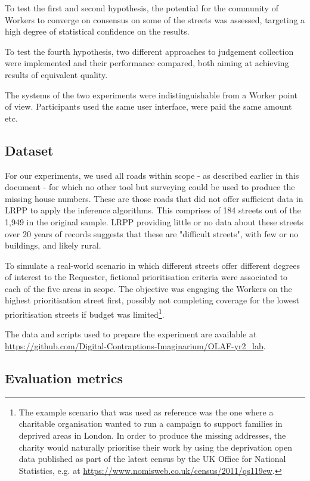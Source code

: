 To test the first and second hypothesis, the potential for the community of Workers to converge on consensus on some of the streets was assessed, targeting a high degree of statistical confidence on the results.

To test the fourth hypothesis, two different approaches to judgement collection were implemented and their performance compared, both aiming at achieving results of equivalent quality.

The systems of the two experiments were indistinguishable from a Worker point of view. Participants used the same user interface, were paid the same amount etc.

\subsection{Dataset}

For our experiments, we used all roads within scope - as described earlier in this document - for which no other tool but surveying could be used to produce the missing house numbers. These are those roads that did not offer sufficient data in LRPP to apply the inference algorithms. This comprises of 184 streets out of the 1,949 in the original sample. LRPP providing little or no data about these streets over 20 years of records suggests that these are "difficult streets", with few or no buildings, and likely rural.

To simulate a real-world scenario in which different streets offer different degrees of interest to the Requester, fictional prioritisation criteria were associated to each of the five areas in scope. The objective was engaging the Workers on the highest prioritisation street first, possibly not completing coverage for the lowest prioritisation streets if budget was limited\footnote{The example scenario that was used as reference was the one where a charitable organisation wanted to run a campaign to support families in deprived areas in London. In order to produce the missing addresses, the charity would naturally prioritise their work by using the deprivation open data published as part of the latest census by the UK Office for National Statistics, e.g. at \url{https://www.nomisweb.co.uk/census/2011/qs119ew}.}.

The data and scripts used to prepare the experiment are available at \url{https://github.com/Digital-Contraptions-Imaginarium/OLAF-yr2_lab}.

\subsection{Evaluation metrics}

